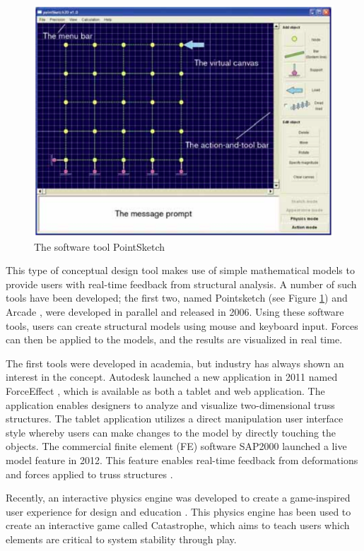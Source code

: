 \begin{figure}
  \includegraphics[width=350pt]{graphics/pointsketch.png}
  \caption{The software tool PointSketch}
  \label{fig:pointsketch}
\end{figure}

This type of conceptual design tool makes use of simple mathematical models to provide users with real-time feedback from structural analysis. A number of such tools have been developed; the first two, named Pointsketch \cite{Olsson2006} (see Figure \ref{fig:pointsketch}) and Arcade \cite{martini2008new}, were developed in parallel and released in 2006. Using these software tools, users can create structural models using mouse and keyboard input. Forces can then be applied to the models, and the results are visualized in real time. 

The first tools were developed in academia, but industry has always shown an interest in the concept. Autodesk launched a new application in 2011 named ForceEffect \cite{Autodesk2011}, which is available as both a tablet and web application. The application enables designers to analyze and visualize two-dimensional truss structures. The tablet application utilizes a direct manipulation user interface style whereby users can make changes to the model by directly touching the objects. The commercial finite element (FE) software SAP2000 \cite{sap2000} launched a live model feature in 2012. This feature enables real-time feedback from deformations and forces applied to truss structures \cite{clune2012object}.

Recently, an interactive physics engine was developed to create a game-inspired user experience for design and education \cite{Senatore2015}. This physics engine has been used to create an interactive game called Catastrophe, which aims to teach users which elements are critical to system stability through play.


